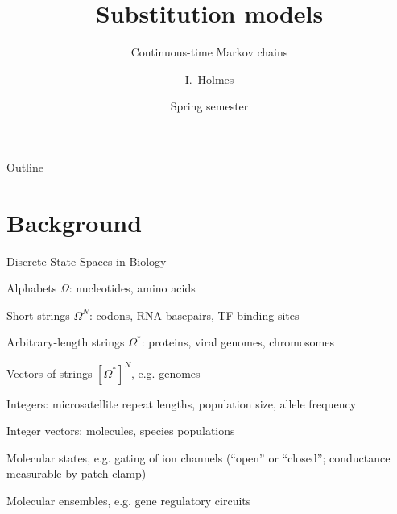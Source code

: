 \documentclass{beamer}
\title[Substitution] %
{Substitution models}
\subtitle
{Continuous-time Markov chains} %
\author%
{I.~Holmes} %
\institute[University of California, Berkeley] %
{
  Department of Bioengineering\\
  University of California, Berkeley}
\date%
{Spring semester}
\begin{document}
\begin{frame}
  \titlepage
\end{frame}

\begin{frame}{Outline}
  \tableofcontents
\end{frame}




\section{Background}

\begin{frame}{Discrete State Spaces in Biology}

\itemb
 \item \alert{Alphabets} $\Omega$: nucleotides, amino acids
 \itemb
  \item Short strings $\Omega^N$: codons, RNA basepairs, TF binding sites
  \item Arbitrary-length strings $\Omega^\ast$: proteins, viral genomes, chromosomes
  \item Vectors of strings $[\Omega^\ast]^N$, e.g. genomes
  \iteme
\pause
 \item \alert{Integers}: microsatellite repeat lengths, population size, allele frequency
 \itemb
  \item Integer vectors: molecules, species populations
 \iteme
 \item \alert{Molecular states}, e.g. gating of ion channels (``open'' or ``closed''; conductance measurable by patch clamp)
 \item \alert{Molecular ensembles}, e.g. gene regulatory circuits
\iteme

\end{frame}
\end{document}
